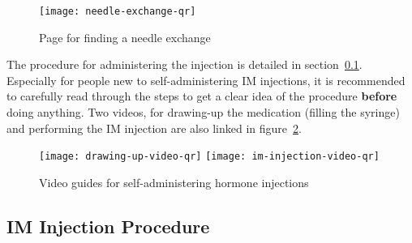 \documentclass[twoside,a5paper]{article}
\begin{document}
\begin{figure}
  \centering
  \texttt{[image: needle-exchange-qr]}
  \caption{Page for finding a needle exchange}
  \label{fig:needle-exchange-qr}
\end{figure}

The procedure for administering the injection is detailed in
section~\ref{subsec:injection-procedure}.  Especially for people new
to self-administering IM injections, it is recommended to carefully
read through the steps to get a clear idea of the procedure
\textbf{before} doing anything.  Two videos, for drawing-up the
medication (filling the syringe) and performing the IM injection are
also linked in figure~\ref{fig:im-injection-videos}.

\begin{figure}
  \centering
  \texttt{[image: drawing-up-video-qr]}
  \hspace{2em}
  \texttt{[image: im-injection-video-qr]}
  \caption{Video guides for self-administering hormone injections}
  \label{fig:im-injection-videos}
\end{figure}

\cleardoublepage

\subsection{IM Injection Procedure}
\label{subsec:injection-procedure}
\end{document}
